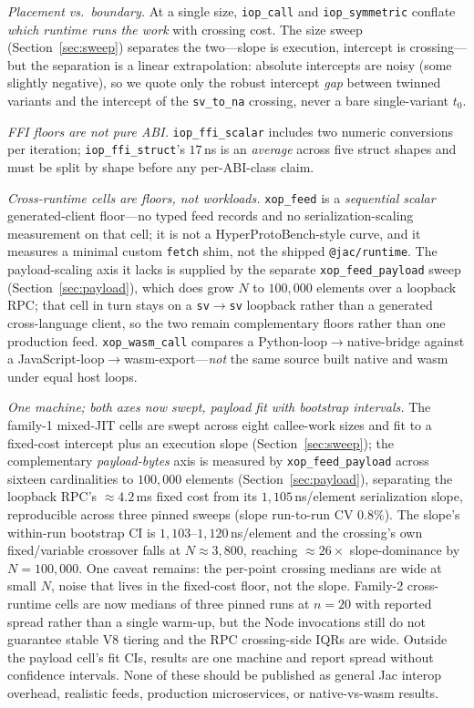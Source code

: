 \documentclass[conference]{IEEEtran}
\newcommand{\code}[1]{\texttt{#1}}
\begin{document}
\emph{Placement vs.\ boundary.} At a single size, \code{iop\_call} and
\code{iop\_symmetric} conflate \emph{which runtime runs the work} with crossing
cost. The size sweep (Section~\ref{sec:sweep}) separates the two---slope is
execution, intercept is crossing---but the separation is a linear extrapolation:
absolute intercepts are noisy (some slightly negative), so we quote only the
robust intercept \emph{gap} between twinned variants and the intercept of the
\code{sv\_to\_na} crossing, never a bare single-variant $t_0$.

\emph{FFI floors are not pure ABI.} \code{iop\_ffi\_scalar} includes two numeric
conversions per iteration; \code{iop\_ffi\_struct}'s $17$\,ns is an
\emph{average} across five struct shapes and must be split by shape before any
per-ABI-class claim.

\emph{Cross-runtime cells are floors, not workloads.} \code{xop\_feed} is a
\emph{sequential scalar} generated-client floor---no typed feed records and no
serialization-scaling measurement on that cell; it is not a HyperProtoBench-style
curve, and it measures a minimal custom \code{fetch} shim, not the shipped
\code{@jac/runtime}. The payload-scaling axis it lacks is supplied by the
separate \code{xop\_feed\_payload} sweep (Section~\ref{sec:payload}), which does
grow $N$ to $100{,}000$ elements over a loopback RPC; that cell in turn stays on a
\code{sv$\rightarrow$sv} loopback rather than a generated cross-language client,
so the two remain complementary floors rather than one production feed.
\code{xop\_wasm\_call} compares a Python-loop$\rightarrow$native-bridge against a
JavaScript-loop$\rightarrow$wasm-export---\emph{not} the same source built native
and wasm under equal host loops.

\emph{One machine; both axes now swept, payload fit with bootstrap intervals.} The family-1 mixed-JIT
cells are swept across eight callee-work sizes and fit to a fixed-cost intercept
plus an execution slope (Section~\ref{sec:sweep}); the complementary
\emph{payload-bytes} axis is measured by
\code{xop\_feed\_payload} across sixteen cardinalities to $100{,}000$ elements
(Section~\ref{sec:payload}), separating the loopback RPC's $\approx$$4.2$\,ms fixed
cost from its $1{,}105$\,ns/element serialization slope, reproducible across three
pinned sweeps (slope run-to-run CV $0.8\%$). The slope's within-run bootstrap CI
is $1{,}103$--$1{,}120$\,ns/element and the crossing's own fixed/variable
crossover falls at $N\approx3{,}800$, reaching $\approx$$26\times$ slope-dominance by
$N{=}100{,}000$. One caveat remains: the per-point crossing medians are wide at
small $N$, noise that lives in the fixed-cost floor, not the slope. Family-2
cross-runtime cells are now medians of three pinned runs at $n{=}20$ with
reported spread rather than a single warm-up, but the Node invocations still do
not guarantee stable V8 tiering and the RPC crossing-side IQRs are wide. Outside
the payload cell's fit CIs, results are one machine and report spread without
confidence intervals. None of these should be published as general Jac interop
overhead, realistic feeds, production microservices, or native-vs-wasm results.
\end{document}
